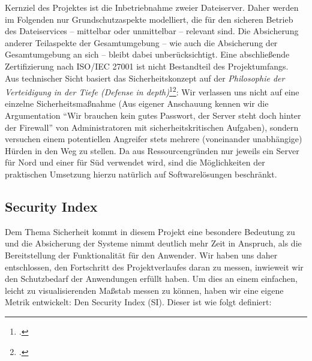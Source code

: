 Kernziel des Projektes ist die Inbetriebnahme zweier Dateiserver. Daher werden im Folgenden nur Grundschutzaspekte modelliert, die für den sicheren Betrieb des Dateiservices -- mittelbar oder unmittelbar -- relevant sind. Die Absicherung anderer Teilaspekte der Gesamtumgebung -- wie auch die Absicherung der Gesamtumgebung an sich -- bleibt dabei unberücksichtigt. Eine abschließende Zertifizierung nach ISO/IEC 27001 ist nicht Bestandteil des Projektumfangs.\\

Aus technischer Sicht basiert das Sicherheitskonzept auf der \emph{Philosophie der Verteidigung in der Tiefe (Defense in depth)}\footcite{wikiDiD}\footcite{kuipers2006control}: Wir verlassen uns nicht auf eine einzelne Sicherheitsmaßnahme (Aus eigener Anschauung kennen wir die Argumentation "`Wir brauchen kein gutes Passwort, der Server steht doch hinter der Firewall"' von Administratoren mit sicherheitskritischen Aufgaben), sondern versuchen einem potentiellen Angreifer stets mehrere (voneinander unabhängige) Hürden in den Weg zu stellen. Da aus Ressourcengründen nur jeweils ein Server für Nord und einer für Süd verwendet wird, sind die Möglichkeiten der praktischen Umsetzung hierzu natürlich auf Softwarelösungen beschränkt.

\subsection{Security Index}
\label{subsec:si}
Dem Thema Sicherheit kommt in diesem Projekt eine besondere Bedeutung zu und die Absicherung der Systeme nimmt deutlich mehr Zeit in Anspruch, als die Bereitstellung der Funktionalität für den Anwender. Wir haben uns daher entschlossen, den Fortschritt des Projektverlaufes daran zu messen, inwieweit wir den Schutzbedarf der Anwendungen erfüllt haben. Um dies an einem einfachen, leicht zu visualisierenden Maßstab messen zu können, haben wir eine eigene Metrik entwickelt: Den Security Index (SI). Dieser ist wie folgt definiert:\\

